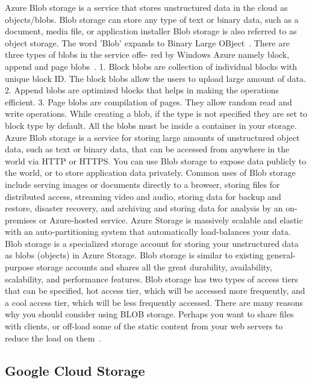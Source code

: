 Azure Blob storage is a service that stores unstructured data in the
cloud as objects/blobs. Blob storage can store any type of text or
binary data, such as a document, media file, or application installer
Blob storage is also referred to as object storage. The word 'Blob'
expands to Binary Large OBject~\cite{www-azure-3}. There are three
types of blobs in the service offe- red by Windows Azure namely block,
append and page blobs~\cite{www-azure-2}.  1. Block blobs are
collection of individual blocks with unique block ID.  The block blobs
allow the users to upload large amount of data.  2. Append blobs are
optimized blocks that helps in making the operations efficient.
3. Page blobs are compilation of pages. They allow random read and
write operations. While creating a blob, if the type is not specified
they are set to block type by default. All the blobs must be inside a
container in your storage.  Azure Blob storage is a service for
storing large amounts of unstructured object data, such as text or
binary data, that can be accessed from anywhere in the world via HTTP
or HTTPS. You can use Blob storage to expose data publicly to the
world, or to store application data privately. Common uses of Blob
storage include serving images or documents directly to a browser,
storing files for distributed access, streaming video and audio,
storing data for backup and restore, disaster recovery, and archiving
and storing data for analysis by an on-premises or Azure-hosted
service.  Azure Storage is massively scalable and elastic with an
auto-partitioning system that automatically load-balances your
data. Blob storage is a specialized storage account for storing your
unstructured data as blobs (objects) in Azure Storage. Blob storage is
similar to existing general-purpose storage accounts and shares all
the great durability, availability, scalability, and performance
features. Blob storage has two types of access tiers that can be
specified, hot access tier, which will be accessed more frequently,
and a cool access tier, which will be less frequently accessed. There
are many reasons why you should consider using BLOB storage. Perhaps
you want to share files with clients, or off-load some of the static
content from your web servers to reduce the load on
them~\cite{www-azure-3}.

     \pv

\subsection{Google Cloud Storage}

